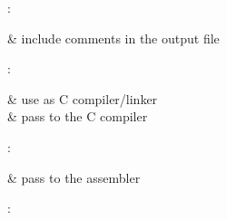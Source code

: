 :

\begin{CmdOptions}
 & include comments in the output file \\

\end{CmdOptions}

:

\begin{CmdOptions}
  & use  as C compiler/linker \\

  & pass  to the C compiler \\

\end{CmdOptions}

:

\begin{CmdOptions}
  & pass  to the assembler \\

\end{CmdOptions}

:

